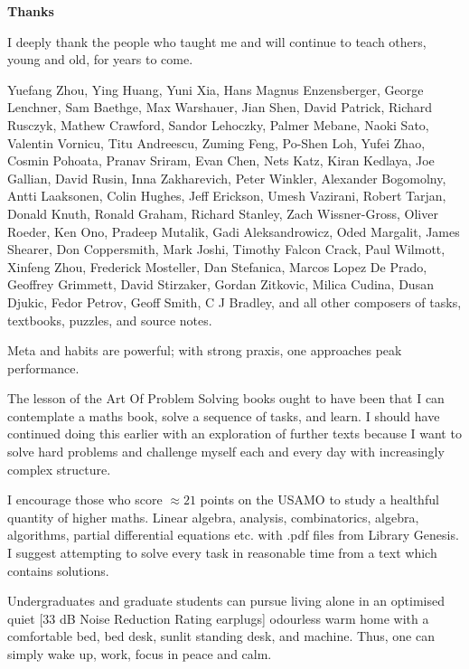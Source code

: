 

\newpage

\textbf{Thanks}

I deeply thank the people who taught me and will continue to teach others, young and old, for years to come.

Yuefang Zhou, Ying Huang, Yuni Xia, Hans Magnus Enzensberger, George Lenchner, Sam Baethge, Max Warshauer, Jian Shen, David Patrick, Richard Rusczyk, Mathew Crawford, Sandor Lehoczky, Palmer Mebane, Naoki Sato, Valentin Vornicu, Titu Andreescu, Zuming Feng, Po-Shen Loh, Yufei Zhao, Cosmin Pohoata, Pranav Sriram, Evan Chen, Nets Katz, Kiran Kedlaya, Joe Gallian, David Rusin, Inna Zakharevich, Peter Winkler, Alexander Bogomolny, Antti Laaksonen, Colin Hughes, Jeff Erickson, Umesh Vazirani, Robert Tarjan, Donald Knuth, Ronald Graham, Richard Stanley, Zach Wissner-Gross, Oliver Roeder, Ken Ono, Pradeep Mutalik, Gadi Aleksandrowicz, Oded Margalit, James Shearer, Don Coppersmith, Mark Joshi, Timothy Falcon Crack, Paul Wilmott, Xinfeng Zhou, Frederick Mosteller, Dan Stefanica, Marcos Lopez De Prado, Geoffrey Grimmett, David Stirzaker, Gordan Zitkovic, Milica Cudina, Dusan Djukic, Fedor Petrov, Geoff Smith, C J Bradley, and all other composers of tasks, textbooks, puzzles, and source notes.

Meta and habits are powerful; with strong praxis, one approaches peak performance.

The lesson of the Art Of Problem Solving books ought to have been that I can contemplate a maths book, solve a sequence of tasks, and learn. I should have continued doing this earlier with an exploration of further texts because I want to solve hard problems and challenge myself each and every day with increasingly complex structure.

I encourage those who score $\approx 21$ points on the USAMO to study a healthful quantity of higher maths. Linear algebra, analysis, combinatorics, algebra, algorithms, partial differential equations etc. with .pdf files from Library Genesis. I suggest attempting to solve every task in reasonable time from a text which contains solutions.

Undergraduates and graduate students can pursue living alone in an optimised quiet [$33$ dB Noise Reduction Rating earplugs] odourless warm home with a comfortable bed, bed desk, sunlit standing desk, and machine. Thus, one can simply wake up, work, focus in peace and calm.